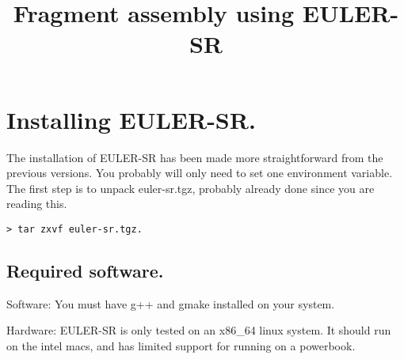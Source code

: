 \documentclass{article}[12pt]
\begin{document}
\title{Fragment assembly using EULER-SR}
\maketitle


\tableofcontents

%
%
%
	

\section{ Installing EULER-SR.}

The installation of EULER-SR has been made more straightforward from
the previous versions. You probably will only need to set one
environment variable.  The first step is to unpack euler-sr.tgz,
probably already done since you are reading this.

\begin{verbatim}
> tar zxvf euler-sr.tgz.
\end{verbatim}

\subsection{ Required software.}
  
  Software: You must have g++ and gmake installed on your system.  

  Hardware: EULER-SR is only tested on an x86\_64 linux system.  It
  should run on the intel macs, and has limited support for running on
  a powerbook.
\end{document}
